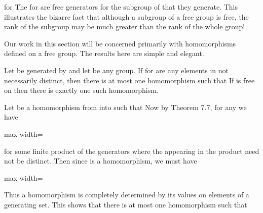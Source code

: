 \documentclass[11pt,oneside]{article}
\begin{document}
\begin{BookBody}
\noindent for  The  for  are free generators for the subgroup of  that they generate. This illustrates the bizarre fact that although a subgroup of a free group is free, the rank of the subgroup may be much greater than the rank of the whole group! \BookEnd{\blacktriangle}


\noindent Our work in this section will be concerned primarily with homomorphisms defined on a free group. The results here are simple and elegant.

 Let  be generated by  and let  be any group. If  for  are any elements in  not necessarily distinct, then there is at most one homomorphism  such that  If  is free on  then there is exactly one such homomorphism.

 Let \BookInline{\phi } be a homomorphism from  into  such that  Now by Theorem 7.7, for any  we have

\begin{center}\begin{adjustbox}{max width=\linewidth}\end{adjustbox}\end{center}

\noindent for some finite product of the generators  where the  appearing in the product need not be distinct. Then since \BookInline{\phi } is a homomorphism, we must have

\begin{center}\begin{adjustbox}{max width=\linewidth}\end{adjustbox}\end{center}

\noindent Thus a homomorphism is completely determined by its values on elements of a generating set. This shows that there is at most one homomorphism such that 

\end{BookBody}
\end{document}
